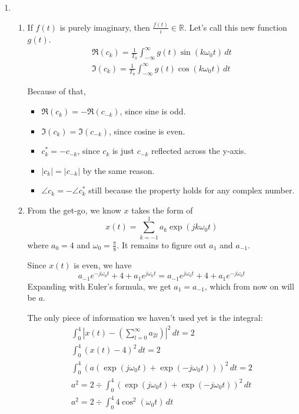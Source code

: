 \documentclass[12pt]{article}
\begin{document}
\begin{enumerate}
      \item \begin{enumerate}
                  \item If $f(t)$ is purely imaginary, then $\frac{f(t)}{i} \in \mathbb{R}$.
                        Let's call this new function $g(t)$.
                        \begin{gather*}
                              \Re(c_k)=\frac{1}{T_0} \int_{-\infty}^{\infty} g(t)\sin(k\omega_0 t)\,dt \\
                              \Im(c_k)=\frac{1}{T_0} \int_{-\infty}^{\infty} g(t)\cos(k\omega_0 t)\,dt
                        \end{gather*}

                        Because of that,
                        \begin{itemize}
                              \item $\Re(c_k)=-\Re(c_{-k})$, since sine is odd.
                              \item $\Im(c_k)=\Im(c_{-k})$, since cosine is even.
                              \item $c_k^* = -c_{-k}$, since $c_k$ is just $c_{-k}$ reflected across the y-axis.
                              \item $|c_k|=|c_{-k}|$ by the same reason.
                              \item $\angle c_k=- \angle c_k^*$ still because the property holds for any complex number.
                        \end{itemize}
                  \item From the get-go, we know $x$ takes the form of
                        \[x(t)=\sum_{k=-1}^{1} a_k \exp\left(jk\omega_0t\right)\]
                        where $a_0=4$ and $\omega_0=\frac{\pi}{8}$.
                        It remains to figure out $a_1$ and $a_{-1}$.

                        Since $x(t)$ is even, we have
                        \[a_{-1}e^{-j\omega_0t}+4+a_1e^{j\omega_0t}=a_{-1}e^{j\omega_0t}+4+a_1e^{-j\omega_0t}\]
                        Expanding with Euler's formula, we get $a_1=a_{-1}$, which from now on will be $a$.

                        The only piece of information we haven't used yet is the integral:
                        \begin{gather*}
                              \int_{0}^{4} \left|x(t)-\left(\sum_{l=0}^{\infty} a_{2l}\right)\right|^2\,dt  = 2 \\
                              \int_{0}^{4} (x(t)-4)^2\,dt = 2 \\
                              \int_{0}^{4} \left(a(\exp(j\omega_0t)+\exp(-j\omega_0t))\right)^2\,dt = 2 \\
                              a^2=2 \div \int_{0}^{4} \left(\exp(j\omega_0t)+\exp(-j\omega_0t)\right)^2\,dt \\
                              a^2=2 \div \int_{0}^{4} 4\cos^2(\omega_0 t)\,dt
                        \end{gather*}


\end{enumerate}
\end{enumerate}
\end{document}
